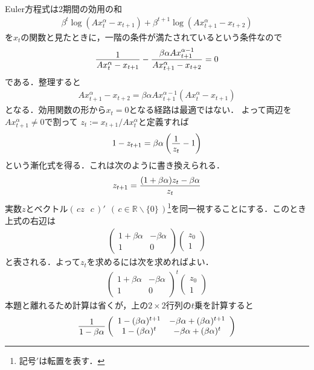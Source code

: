 \documentclass[a4paper,11pt]{jsarticle}
\DeclareRobustCommand{\lfrac}[2]{{\lower.4ex\hbox{\begingroup\ensuremath{#1}\endgroup}\over{\hspace{.2mm}#2\hspace{.2mm}}}}
\begin{document}
Euler方程式は2期間の効用の和
\begin{align*}
	\beta^t \log(Ax_t^\alpha-x_{t+1})+\beta^{t+1} \log(Ax_{t+1}^\alpha-x_{t+2})
\end{align*}
を$x_t$の関数と見たときに，一階の条件が満たされているという条件なので
\begin{align*}
	\lfrac{1}{Ax_t^\alpha-x_{t+1}}-\lfrac{\beta \alpha Ax_{t+1}^{\alpha-1}}{Ax_{t+1}^\alpha-x_{t+2}}=0
\end{align*}
である．整理すると
\begin{align*}
	Ax_{t+1}^\alpha-x_{t+2}=\beta \alpha Ax_{t+1}^{\alpha-1}(Ax_t^\alpha-x_{t+1})
\end{align*}
となる．効用関数の形から$x_t=0$となる経路は最適ではない．
よって両辺を$Ax_{t+1}^\alpha\neq 0$で割って
$z_t:=x_{t+1}/Ax_t^\alpha$と定義すれば
\begin{align*}
	1-z_{t+1}=\beta \alpha  \left(\lfrac{1}{z_t}-1\right)
\end{align*}
という漸化式を得る．これは次のように書き換えられる．
\begin{align*}
	z_{t+1}=\lfrac{(1+\beta \alpha )z_t-\beta \alpha }{z_t}
\end{align*}
実数$z$とベクトル$(\,cz \;\;\, c\,)' \;\,(\,c \in \mathbb{R}\backslash \{0\}\,)$\footnote{記号$'$は転置を表す．}を同一視することにする．このとき
上式の右辺は
\begin{align*}
	\left(\begin{array}{cc}1+\beta \alpha  & -\beta \alpha \\ 1 & 0 \end{array}\right) \left(\begin{array}{c} z_0 \\ 1 \end{array}\right)
\end{align*}
と表される．よって$z_t$を求めるには次を求めればよい．
\begin{align*}
	\left(\begin{array}{cc}1+\beta \alpha  & -\beta \alpha \\ 1 & 0 \end{array}\right)^t \left(\begin{array}{c} z_0 \\ 1 \end{array}\right)
\end{align*}
本題と離れるため計算は省くが，上の$2 \times 2$行列の$t$乗を計算すると
\begin{align*}
	\lfrac{1}{1-\beta \alpha} \left(\begin{array}{cc} 1-(\beta \alpha)^{t+1} & -\beta \alpha + (\beta \alpha )^{t+1} \\1-(\beta \alpha )^t & -\beta \alpha  +(\beta \alpha)^t \end{array}\right)
\end{align*}
\end{document}
